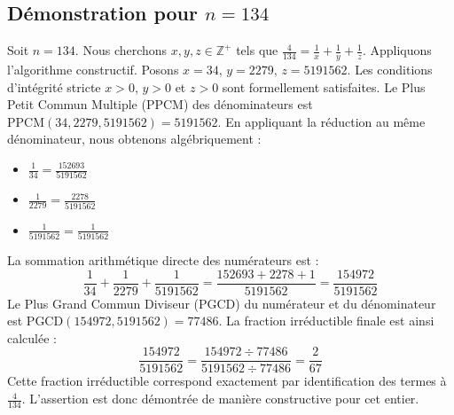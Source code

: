 \documentclass[11pt,a4paper]{article}
\begin{document}
\subsection{Démonstration pour $n = 134$}
Soit $n = 134$. Nous cherchons $x, y, z \in \mathbb{Z}^{+}$ tels que $\frac{4}{134} = \frac{1}{x} + \frac{1}{y} + \frac{1}{z}$.
Appliquons l'algorithme constructif. Posons $x = 34$, $y = 2279$, $z = 5191562$.
Les conditions d'intégrité stricte $x > 0$, $y > 0$ et $z > 0$ sont formellement satisfaites.
Le Plus Petit Commun Multiple (PPCM) des dénominateurs est $\text{PPCM}(34, 2279, 5191562) = 5191562$.
En appliquant la réduction au même dénominateur, nous obtenons algébriquement :
\begin{itemize}
    \item $\frac{1}{34} = \frac{152693}{5191562}$
    \item $\frac{1}{2279} = \frac{2278}{5191562}$
    \item $\frac{1}{5191562} = \frac{1}{5191562}$
\end{itemize}
La sommation arithmétique directe des numérateurs est :
$$ \frac{1}{34} + \frac{1}{2279} + \frac{1}{5191562} = \frac{152693 + 2278 + 1}{5191562} = \frac{154972}{5191562} $$
Le Plus Grand Commun Diviseur (PGCD) du numérateur et du dénominateur est $\text{PGCD}(154972, 5191562) = 77486$.
La fraction irréductible finale est ainsi calculée :
$$ \frac{154972}{5191562} = \frac{154972 \div 77486}{5191562 \div 77486} = \frac{2}{67} $$
Cette fraction irréductible correspond exactement par identification des termes à $\frac{4}{134}$. L'assertion est donc démontrée de manière constructive pour cet entier.
\end{document}
